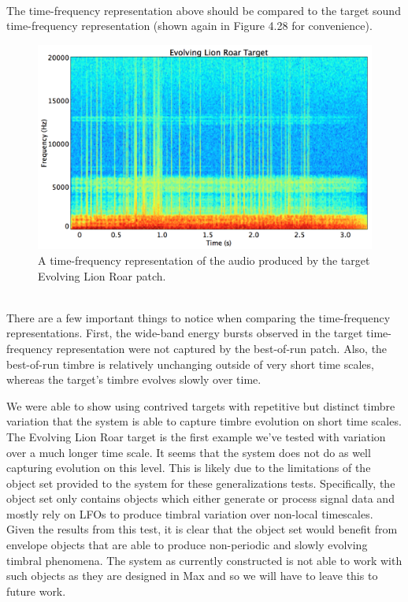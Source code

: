 \documentclass[a4paper,12pt]{report} 	%
\numberwithin{figure}{chapter}
\numberwithin{table}{chapter}
\numberwithin{equation}{chapter}
\begin{document}
\begin{flushleft}
\begin{figure}[h!]
\begin{center}
\end{center}
\end{figure}
\\
The time-frequency representation above should be compared to the target sound time-frequency representation (shown again in Figure 4.28 for convenience).
\begin{figure}[h!]
\begin{center}
\includegraphics[scale=0.35,width=\linewidth]{EvolvingLionRoarTargetSTFT}
\caption[Target Evolving Lion Roar Time-Frequency Representation]{A time-frequency representation of the audio produced by the target Evolving Lion Roar patch.}
\end{center}
\end{figure}
\\
There are a few important things to notice when comparing the time-frequency representations. First, the wide-band energy bursts observed in the target time-frequency representation were not captured by the best-of-run patch. Also, the best-of-run timbre is relatively unchanging outside of very short time scales, whereas the target's timbre evolves slowly over time. 

We were able to show using contrived targets with repetitive but distinct timbre variation that the system is able to capture timbre evolution on short time scales. The Evolving Lion Roar target is the first example we've tested with variation over a much longer time scale. It seems that the system does not do as well capturing evolution on this level. This is likely due to the limitations of the object set provided to the system for these generalizations tests. Specifically, the object set only contains objects which either generate or process signal data and mostly rely on LFOs to produce timbral variation over non-local timescales. Given the results from this test, it is clear that the object set would benefit from envelope objects that are able to produce non-periodic and slowly evolving timbral phenomena. The system as currently constructed is not able to work with such objects as they are designed in Max and so we will have to leave this to future work.


\end{flushleft}
\end{document}

